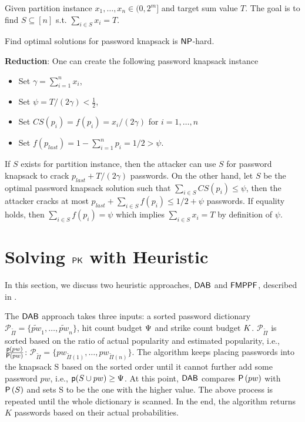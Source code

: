 \begin{definition}
	Given partition instance $x_1,\ldots,x_{n} \in (0,2^m]$ and target sum value $T$. The  goal is to find $S \subseteq [n]$ s.t. $\sum_{i\in S} x_i = T$.
\end{definition}

\begin{thm}\label{appendix:ProofOfPasswordKnapsack}
	Find optimal solutions for password knapsack is $\mathsf{NP}$-hard.
\end{thm}

\textbf{Reduction}: One can create the following password knapsack instance 
\begin{itemize}
	\item Set $\gamma = \sum_{i=1}^n x_i$,
	\item Set $\psi = T/(2\gamma )< \frac{1}{2}$,
	\item Set $CS(p_i)= f(p_{i}) = x_i/(2\gamma)$ for $i=1,\ldots, n$
	\item Set $f(p_{last}) = 1-\sum_{i =1}^{n} p_i = 1/2 > \psi$. 
\end{itemize}
If $S$ exists for partition instance, then the attacker can use $S$ for password knapsack to crack $p_{last}+T/(2\gamma)$ passwords. On the other hand, let $S$ be the optimal password knapsack solution such that $\sum_{i \in S} CS(p_i) \leq \psi$, then the attacker cracks at most $p_{last}+\sum_{i \in S} f(p_i) \leq 1/2 + \psi$ passwords. If equality holds, then $\sum_{i \in S} f(p_i) = \psi$ which implies $\sum_{i \in S} x_i = T$ by definition of $\psi$.




\vspace{-0.1in}
\section{Solving $\mathsf{PK}$ with Heuristic}\label{appendix:solvePK}
In this section, we discuss two heuristic approaches, $\mathsf{DAB}$ and $\mathsf{FMPPF}$, described in .  

The $\mathsf{DAB}$ approach takes three inputs: a sorted password dictionary $\mathcal{P}_{\tilde{\Pi}} = \{\tilde{pw}_1, \ldots, \tilde{pw}_{n} \}$, hit count budget $\Psi$ and strike count budget $K$. $\mathcal{P}_{\tilde{\Pi}}$ is sorted based on the ratio of actual popularity and estimated popularity, i.e., $\frac{\textsf{p}(pw)}{\mathsf{P}\left(pw\right)}$: $\mathcal{P}_{\tilde{\Pi}} = \{pw_{\tilde{\Pi}(1)}, \ldots, pw_{\tilde{\Pi}(n)} \}$. The algorithm keeps placing passwords into the knapsack S based on the sorted order until it cannot further add some password $pw$, i.e., $\textsf{p}(S \cup pw) \ge \Psi$. At this point, $\mathsf{DAB}$ compares $\mathsf{P}\left(pw\right)$ with $\mathsf{P}\left(S\right)$ and sets S to be the one with the higher value. The above process is repeated until the whole dictionary is scanned. In the end, the algorithm returns $K$ passwords based on their actual probabilities.

